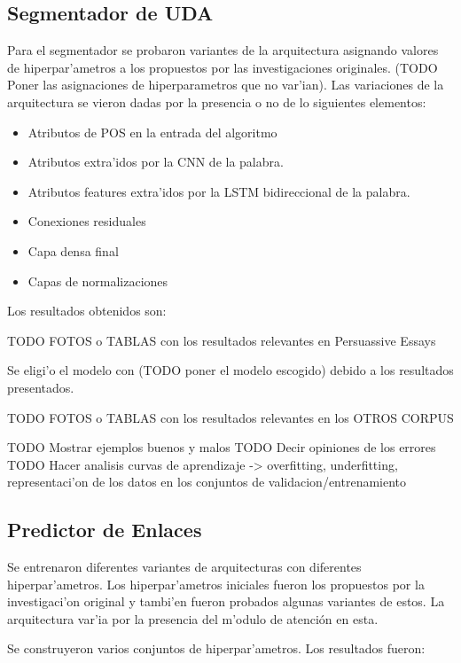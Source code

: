 \subsection{Segmentador de UDA}

Para el segmentador se probaron variantes de la arquitectura asignando valores de hiperpar'ametros a los propuestos
por las investigaciones originales. (TODO Poner las asignaciones de hiperparametros que no var'ian). Las variaciones 
de la arquitectura se vieron dadas por la presencia o no de lo siguientes elementos:

\begin{itemize}
    \item Atributos de POS en la entrada del algoritmo
    \item Atributos extra'idos por la CNN de la palabra.
    \item Atributos features extra'idos por la LSTM bidireccional de la palabra.
    \item Conexiones residuales
    \item Capa densa final
    \item Capas de normalizaciones
\end{itemize}

Los resultados obtenidos son:

TODO FOTOS o TABLAS con los resultados relevantes en Persuassive Essays

Se eligi'o el modelo con (TODO poner el modelo escogido) debido a los resultados presentados.

TODO FOTOS o TABLAS con los resultados relevantes en los OTROS CORPUS

TODO Mostrar ejemplos buenos y malos
TODO Decir opiniones de los errores
TODO Hacer analisis curvas de aprendizaje -> overfitting, underfitting, representaci'on de los datos en los conjuntos de validacion/entrenamiento

\subsection{Predictor de Enlaces}

Se entrenaron diferentes variantes de arquitecturas con diferentes hiperpar'ametros. Los hiperpar'ametros
iniciales fueron los propuestos por la investigaci'on original y tambi'en fueron probados algunas variantes 
de estos. La arquitectura var'ia por la presencia del m'odulo de atención en esta.

Se construyeron varios conjuntos de hiperpar'ametros. Los resultados fueron:

